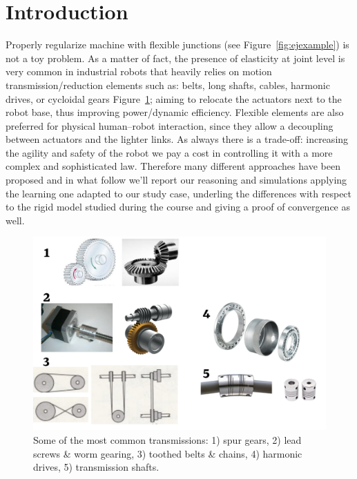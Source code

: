 \section*{Introduction}
Properly regularize machine with flexible junctions (see \small{Figure~\ref{fig:ejexample}}) is not a toy problem. As a matter of fact, the presence of elasticity at joint level is very common in industrial robots that heavily relies on motion transmission/reduction elements such as: belts, long shafts, cables, harmonic drives, or cycloidal gears Figure~\ref{fel}; aiming to relocate the actuators next to the robot base, thus improving power/dynamic efficiency. Flexible elements are also preferred for physical human–robot interaction, since they allow a decoupling between actuators and the lighter links. As always there is a trade-off: increasing the agility and safety of the robot we pay a cost in controlling it with a more complex and sophisticated law. Therefore many different approaches have been proposed \cite{simplepd,deluca93,deluca96} and in what follow we'll report our reasoning and simulations applying the learning one \cite{deluca96} adapted to our study case, underling the differences with respect to the rigid model studied during the course and giving a proof of convergence as well.

\begin{figure}[h!]
\centerline{\includegraphics[scale=1]{figures/flexelements.png}}
\caption{\label{fel}
Some of the most common transmissions: 1) spur gears, 2) lead screws \& worm gearing, 3)
toothed belts \& chains, 4) harmonic drives, 5) transmission shafts.}
\end{figure}

